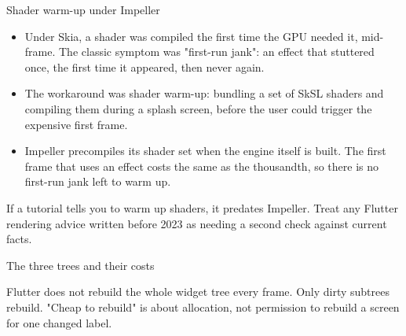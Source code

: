 \documentclass[10pt,aspectratio=169,t]{beamer}
\begin{document}
\begin{frame}[eyebrow=Rendering]{Shader warm-up under Impeller}
  \begin{itemize}
    \item Under Skia, a shader was compiled the first time the GPU needed it, mid-frame. The classic symptom was "first-run jank": an effect that stuttered once, the first time it appeared, then never again.
    \item The workaround was shader warm-up: bundling a set of SkSL shaders and compiling them during a splash screen, before the user could trigger the expensive first frame.
    \item Impeller precompiles its shader set when the engine itself is built. The first frame that uses an effect costs the same as the thousandth, so there is no first-run jank left to warm up.
  \end{itemize}
  \begin{takeaway}{If a tutorial tells you to warm up shaders, it predates Impeller.}
    Treat any Flutter rendering advice written before 2023 as needing a second check against current facts.
  \end{takeaway}
\end{frame}

\begin{frame}[eyebrow=Rendering]{The three trees and their costs}
  \vskip 3mm
  \begin{grid}[3]
  \end{grid}
  \begin{takeaway}{Flutter does not rebuild the whole widget tree every frame.}
    Only dirty subtrees rebuild. "Cheap to rebuild" is about allocation, not permission to rebuild a screen for one changed label.
  \end{takeaway}
\end{frame}
\end{document}
